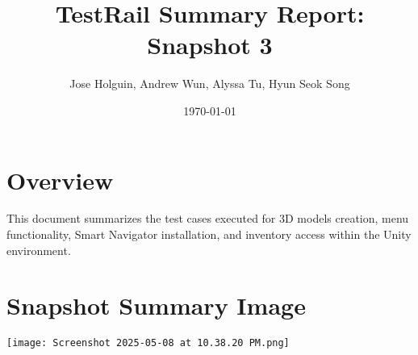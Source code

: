 \documentclass[11pt]{article}
\title{TestRail Summary Report: Snapshot 3}
\author{Jose Holguin, Andrew Wun, Alyssa Tu, Hyun Seok Song}
\date{\today}
\begin{document}
\maketitle

\section{Overview}
This document summarizes the test cases executed for 3D models creation, menu functionality, Smart Navigator installation, and inventory access within the Unity environment.

\section{Snapshot Summary Image}

\texttt{[image: Screenshot 2025-05-08 at 10.38.20 PM.png]}
\end{document}
